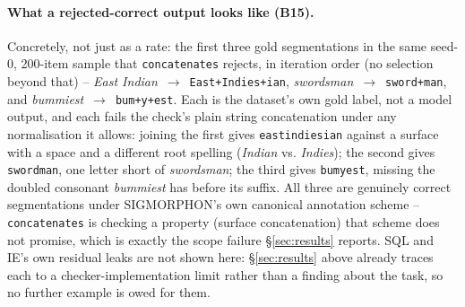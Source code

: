 \documentclass[11pt]{article}
\begin{document}
\paragraph{What a rejected-correct output looks like (B15).} Concretely, not
just as a rate: the first three gold segmentations in the same seed-0,
200-item sample that \texttt{concatenates} rejects, in iteration order (no
selection beyond that) --
\emph{East Indian}~$\to$~\texttt{East+Indies+ian},
\emph{swordsman}~$\to$~\texttt{sword+man}, and
\emph{bummiest}~$\to$~\texttt{bum+y+est}. Each is the dataset's own gold
label, not a model output, and each fails the check's plain string
concatenation under any normalisation it allows: joining the first gives
\texttt{eastindiesian} against a surface with a space and a different
root spelling (\emph{Indian} vs. \emph{Indies}); the second gives
\texttt{swordman}, one letter short of \emph{swordsman}; the third gives
\texttt{bumyest}, missing the doubled consonant \emph{bummiest} has before
its suffix. All three are genuinely correct
segmentations under SIGMORPHON's own canonical annotation scheme --
\texttt{concatenates} is checking a property (surface concatenation) that
scheme does not promise, which is exactly the scope failure \S\ref{sec:results}
reports. SQL and IE's own residual leaks are not shown here: \S\ref{sec:results}
above already traces each to a checker-implementation limit rather than a
finding about the task, so no further example is owed for them.
\end{document}

